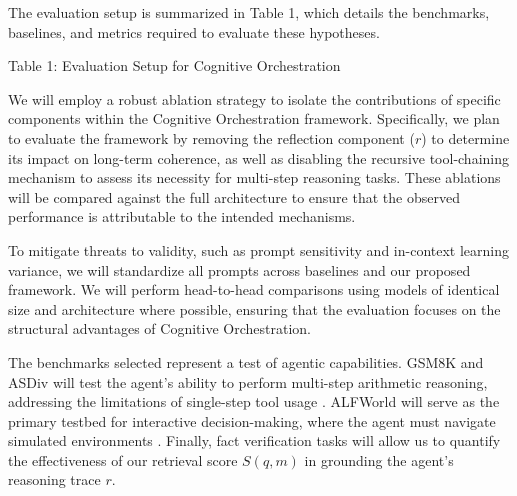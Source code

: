 \documentclass[11pt,a4paper]{article}
\begin{document}
The evaluation setup is summarized in Table 1, which details the benchmarks, baselines, and metrics required to evaluate these hypotheses.

Table 1: Evaluation Setup for Cognitive Orchestration

\begin{table}[htbp]
\centering\small
{}
\end{table}

We will employ a robust ablation strategy to isolate the contributions of specific components within the Cognitive Orchestration framework. Specifically, we plan to evaluate the framework by removing the reflection component ($r$) to determine its impact on long-term coherence, as well as disabling the recursive tool-chaining mechanism to assess its necessity for multi-step reasoning tasks. These ablations will be compared against the full architecture to ensure that the observed performance is attributable to the intended mechanisms.

To mitigate threats to validity, such as prompt sensitivity and in-context learning variance, we will standardize all prompts across baselines and our proposed framework. We will perform head-to-head comparisons using models of identical size and architecture where possible, ensuring that the evaluation focuses on the structural advantages of Cognitive Orchestration.

The benchmarks selected represent a test of agentic capabilities. GSM8K and ASDiv will test the agent's ability to perform multi-step arithmetic reasoning, addressing the limitations of single-step tool usage \cite{schick2023}. ALFWorld will serve as the primary testbed for interactive decision-making, where the agent must navigate simulated environments \cite{yao2023}. Finally, fact verification tasks will allow us to quantify the effectiveness of our retrieval score $S(q, m)$ in grounding the agent's reasoning trace $r$.
\end{document}
